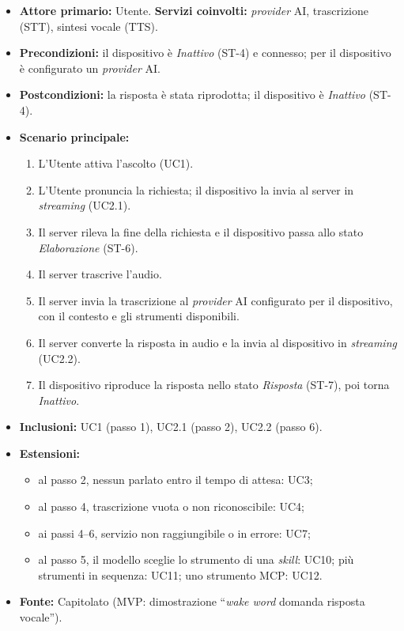 \documentclass[12pt,a4paper]{article}
\newcommand{\tightlist}{\setlength{\itemsep}{1pt}\setlength{\parskip}{0pt}}
\begin{document}
\begin{itemize}
\tightlist
\item \textbf{Attore primario:} Utente. \textbf{Servizi coinvolti:} \emph{provider} AI, trascrizione (STT), sintesi vocale (TTS).
\item \textbf{Precondizioni:} il dispositivo è \emph{Inattivo} (ST-4) e connesso; per il dispositivo è configurato un \emph{provider} AI.
\item \textbf{Postcondizioni:} la risposta è stata riprodotta; il dispositivo è \emph{Inattivo} (ST-4).
\item \textbf{Scenario principale:}
\begin{enumerate}
\tightlist
\item L'Utente attiva l'ascolto (UC1).
\item L'Utente pronuncia la richiesta; il dispositivo la invia al server in \emph{streaming} (UC2.1).
\item Il server rileva la fine della richiesta e il dispositivo passa allo stato \emph{Elaborazione} (ST-6).
\item Il server trascrive l'audio.
\item Il server invia la trascrizione al \emph{provider} AI configurato per il dispositivo, con il contesto e gli strumenti disponibili.
\item Il server converte la risposta in audio e la invia al dispositivo in \emph{streaming} (UC2.2).
\item Il dispositivo riproduce la risposta nello stato \emph{Risposta} (ST-7), poi torna \emph{Inattivo}.
\end{enumerate}
\item \textbf{Inclusioni:} UC1 (passo 1), UC2.1 (passo 2), UC2.2 (passo 6).
\item \textbf{Estensioni:}
\begin{itemize}
\tightlist
\item al passo 2, nessun parlato entro il tempo di attesa: UC3;
\item al passo 4, trascrizione vuota o non riconoscibile: UC4;
\item ai passi 4--6, servizio non raggiungibile o in errore: UC7;
\item al passo 5, il modello sceglie lo strumento di una \emph{skill}: UC10; più strumenti in sequenza: UC11; uno strumento MCP: UC12.
\end{itemize}
\item \textbf{Fonte:} Capitolato (MVP: dimostrazione ``\emph{wake word} \textrightarrow{} domanda \textrightarrow{} risposta vocale'').
\end{itemize}
\end{document}
